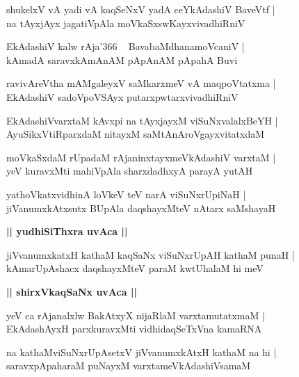 \documentclass[twoside,12pt,openright]{book}
\newcounter{shloka}[chapter]
\def\uvaca#1{\centerline{{\large\textbf{#1}}}}
\begin{document}
\begin{shloka}%
shukelxV vA yadi vA kaqSeNxV yadA ceYkAdashiV BaveVtf |\\
na tAyxjAyx jagatiVpAla moVkaSxswKayxvivadhiRniV 
\end{shloka}

\begin{shloka}%
EkAdashiV kalw rAja\char'366 ~ BavabaMdhanamoVcaniV |\\
kAmadA saravxkAmAnAM pApAnAM pApahA Buvi
\end{shloka}

\begin{shloka}%
ravivAreVtha mAMgaleyxV saMkarxmeV vA maqpoVtatxma |\\
EkAdashiV sadoVpoVSAyx putarxpwtarxvivadhiRniV 
\end{shloka}

\begin{shloka}%
EkAdashiVvarxtaM kAvxpi na tAyxjayxM viSuNxvalalxBeYH |\\
AyuSikxVtiRparxdaM nitayxM saMtAnAroVgayxvitatxdaM 
\end{shloka}

\begin{shloka}%
moVkaSxdaM rUpadaM rAjaninxtayxmeVkAdashiV varxtaM |\\
yeV kuravxMti mahiVpAla sharxdadhxyA parayA yutAH 
\end{shloka}

\begin{shloka}%
yathoVkatxvidhinA loVkeV teV narA viSuNxrUpiNaH |\\
jiVanumxkAtxsutx BUpAla daqshayxMteV nAtarx saMshayaH 
\end{shloka}

\uvaca{|| yudhiSiThxra uvAca ||}

\begin{shloka}%
jiVvanumxkatxH kathaM kaqSaNx viSuNxrUpAH kathaM punaH |\\
kAmarUpAshacx daqshayxMteV paraM kwtUhalaM hi meV 
\end{shloka}

\uvaca{|| shirxVkaqSaNx uvAca ||}

\begin{shloka}%
yeV ca rAjanalxlw BakAtxyX nijaRlaM varxtamutatxmaM |\\
EkAdashAyxH parxkuravxMti vidhidaqSeTxVna kamaRNA
\end{shloka}

\begin{shloka}%
na kathaMviSuNxrUpAsetxV jiVvanumxkAtxH kathaM na hi |\\
saravxpApaharaM puNayxM varxtameVkAdashiVsamaM
\end{shloka}
\end{document}

